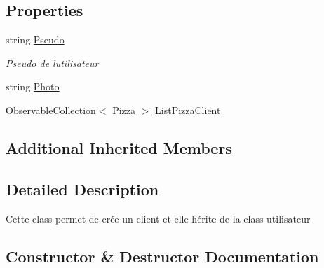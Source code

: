 \subsection*{Properties}
\begin{DoxyCompactItemize}
\item 
string \hyperlink{classModele_1_1Client_a56ea6461c998b196068f435e003d48d3}{Pseudo}
\begin{DoxyCompactList}\small\item\em Pseudo de l\textquotesingle{}utilisateur \end{DoxyCompactList}\item 
string \hyperlink{classModele_1_1Client_a631e7a15fd8974dd434d5801ee95cafa}{Photo}
\item 
Observable\+Collection$<$ \hyperlink{classModele_1_1Pizza}{Pizza} $>$ \hyperlink{classModele_1_1Client_a14c37e4b9ab856a1e36b7c1610a0536c}{List\+Pizza\+Client}
\end{DoxyCompactItemize}
\subsection*{Additional Inherited Members}


\subsection{Detailed Description}
Cette class permet de crée un client et elle hérite de la class utilisateur 



\subsection{Constructor \& Destructor Documentation}
\mbox{\label{classModele_1_1Client_a3799aa993898124e3be733ea75b4993b}} 
